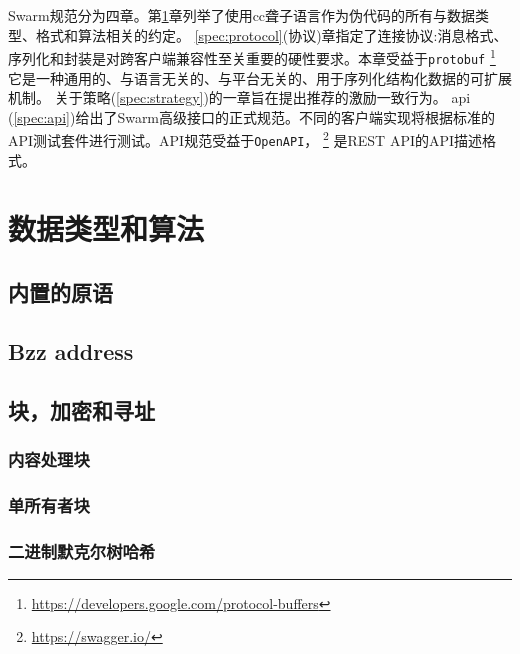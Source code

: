 
Swarm规范分为四章。第\ref{spec:convention}章列举了使用cc聋子语言作为伪代码的所有与数据类型、格式和算法相关的约定。
\ref{spec:protocol}(协议)章指定了连接协议:消息格式、序列化和封装是对跨客户端兼容性至关重要的硬性要求。本章受益于\lstinline{protobuf}
%
\footnote{\url{https://developers.google.com/protocol-buffers}}
%
它是一种通用的、与语言无关的、与平台无关的、用于序列化结构化数据的可扩展机制。
关于策略(\ref{spec:strategy})的一章旨在提出推荐的激励一致行为。
api (\ref{spec:api})给出了Swarm高级接口的正式规范。不同的客户端实现将根据标准的API测试套件进行测试。API规范受益于\lstinline{OpenAPI}，%
%
\footnote{\url{https://swagger.io/}}
%
是REST API的API描述格式。

\newpage{} 
{}
\listoftheorems[ignoreall,显示= {定义}]

\chapter{数据类型和算法}\label{spec:convention}

\orange{}

\section{内置的原语\statusyellow}\label{spec:format:builtin}


\section{Bzz address\statusgreen}\label{spec:format:bzzaddress}


\section{块，加密和寻址\statusyellow}
\subsection{内容处理块\statusgreen}\label{spec:format:chunks}

\subsection{单所有者块\statusgreen}\label{spec:format:soc}

\subsection{二进制默克尔树哈希\statusyellow}\label{spec:format:bmt}

